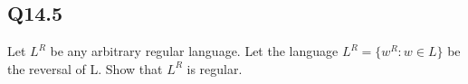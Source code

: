 \documentclass{article}
\begin{document}
\subsection*{Q14.5}
Let $L^R$ be any arbitrary regular language. Let the language $L^R = \{w^R : w \in L\}$ be the reversal of L.
Show that $L^R$ is regular.
\newpage
\end{document}
